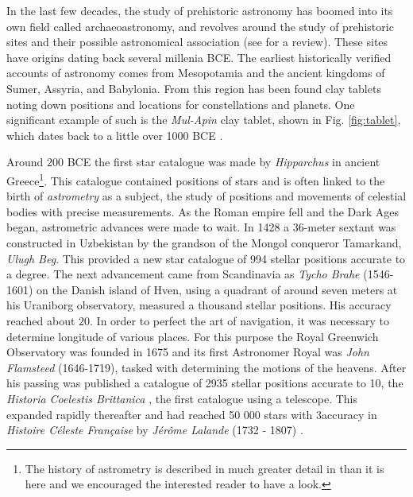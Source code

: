 In the last few decades, the study of prehistoric astronomy has boomed into its own field called archaeoastronomy, and revolves around the study of prehistoric sites and their possible astronomical association (see \citealt{magli:20} for a review). These sites have origins dating back several millenia BCE. The earliest historically verified accounts of astronomy comes from Mesopotamia and the ancient kingdoms of Sumer, Assyria, and Babylonia. From this region has been found clay tablets noting down positions and locations for constellations and planets. One significant example of such is the \textit{Mul-Apin} clay tablet, shown in Fig. \ref{fig:tablet}, which dates back to a little over 1000 BCE \citep{dejong:07}. 

Around 200 BCE the first star catalogue was made by \textit{Hipparchus} in ancient Greece\footnote{The history of astrometry is described in much greater detail in \cite{perryman:12} than it is here and we encouraged the interested reader to have a look.}. This catalogue contained positions of stars and is often linked to the birth of \textit{astrometry} as a subject, the study of positions and movements of celestial bodies with precise measurements. As the Roman empire fell and the Dark Ages began, astrometric advances were made to wait. In 1428 a 36-meter sextant was constructed in Uzbekistan by the grandson of the Mongol conqueror Tamarkand, \textit{Ulugh Beg}. This provided a new star catalogue of 994 stellar positions accurate to a degree. The next advancement came from Scandinavia as \textit{Tycho Brahe} (1546-1601) on the Danish island of Hven, using a quadrant of around seven meters at his Uraniborg observatory, measured a thousand stellar positions. His accuracy reached about 20\as. In order to perfect the art of navigation, it was necessary to determine longitude of various places. For this purpose the Royal Greenwich Observatory was founded in 1675 and its first Astronomer Royal was \textit{John Flamsteed} (1646-1719), tasked with determining the motions of the heavens. After his passing was published a catalogue of 2935 stellar positions accurate to 10\as, the \textit{Historia Coelestis Brittanica} \citep{flamsteed:1725}, the first catalogue using a telescope. This expanded rapidly thereafter and had reached 50 000 stars with 3\as accuracy in \textit{Histoire Céleste Française} by \textit{Jérôme Lalande} (1732 - 1807) \citep{lalande:1801}. 

